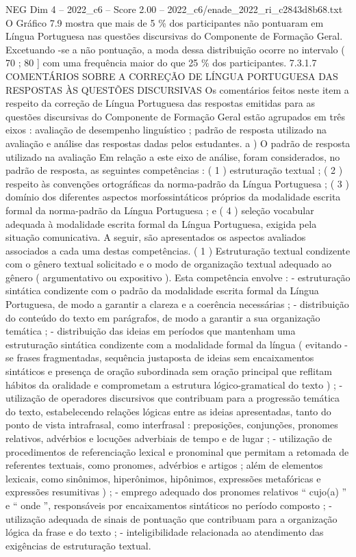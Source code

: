 \begin{textsample}{NEG Dim 4 – 2022\_c6 – Score 2.00 – 2022\_c6/enade\_2022\_ri\_c2843d8b68.txt}
O Gráfico 7.9 mostra que mais de 5 \% dos participantes não pontuaram em Língua Portuguesa nas questões discursivas do Componente de Formação Geral.
Excetuando -se a não pontuação, a moda dessa distribuição ocorre no intervalo ( 70 ; 80 ] com uma frequência maior do que 25 \% dos participantes. 7.3.1.7 COMENTÁRIOS SOBRE A CORREÇÃO DE LÍNGUA PORTUGUESA DAS RESPOSTAS ÀS QUESTÕES DISCURSIVAS Os comentários feitos neste item a respeito da correção de Língua Portuguesa das respostas emitidas para as questões discursivas do Componente de Formação Geral estão agrupados em três eixos : avaliação de desempenho linguístico ; padrão de resposta utilizado na avaliação e análise das respostas dadas pelos estudantes. a ) O padrão de resposta utilizado na avaliação Em relação a este eixo de análise, foram considerados, no padrão de resposta, as seguintes competências : ( 1 ) estruturação textual ; ( 2 ) respeito às convenções ortográficas da norma-padrão da Língua Portuguesa ; ( 3 ) domínio dos diferentes aspectos morfossintáticos próprios da modalidade escrita formal da norma-padrão da Língua Portuguesa ; e ( 4 ) seleção vocabular adequada à modalidade escrita formal da Língua Portuguesa, exigida pela situação comunicativa.
A seguir, são apresentados os aspectos avaliados associados a cada uma destas competências. ( 1 ) Estruturação textual condizente com o gênero textual solicitado e o modo de organização textual adequado ao gênero ( argumentativo ou expositivo ).
Esta competência envolve : - estruturação sintática condizente com o padrão da modalidade escrita formal da Língua Portuguesa, de modo a garantir a clareza e a coerência necessárias ; - distribuição do conteúdo do texto em parágrafos, de modo a garantir a sua organização temática ; - distribuição das ideias em períodos que mantenham uma estruturação sintática condizente com a modalidade formal da língua ( evitando -se frases fragmentadas, sequência justaposta de ideias sem encaixamentos sintáticos e presença de oração subordinada sem oração principal que reflitam hábitos da oralidade e comprometam a estrutura lógico-gramatical do texto ) ; - utilização de operadores discursivos que contribuam para a progressão temática do texto, estabelecendo relações lógicas entre as ideias apresentadas, tanto do ponto de vista intrafrasal, como interfrasal : preposições, conjunções, pronomes relativos, advérbios e locuções adverbiais de tempo e de lugar ; - utilização de procedimentos de referenciação lexical e pronominal que permitam a retomada de referentes textuais, como pronomes, advérbios e artigos ; além de elementos lexicais, como sinônimos, hiperônimos, hipônimos, expressões metafóricas e expressões resumitivas ) ; - emprego adequado dos pronomes relativos “ cujo(a) ” e “ onde ”, responsáveis por encaixamentos sintáticos no período composto ; - utilização adequada de sinais de pontuação que contribuam para a organização lógica da frase e do texto ; - inteligibilidade relacionada ao atendimento das exigências de estruturação textual.

\end{textsample}
